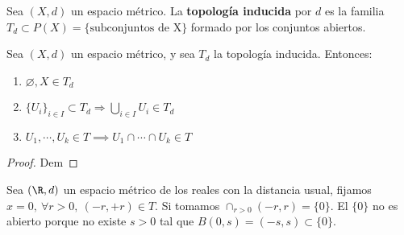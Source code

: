 \begin{ndef}
    Sea $(X,d)$ un espacio métrico. La \textbf{topología inducida} por $d$ es la familia $T_d \subset P(X) = \{\text{subconjuntos de X} \}$ formado por los conjuntos abiertos.
\end{ndef}
\begin{nprop}
  Sea $(X,d)$ un espacio métrico, y sea $T_d$ la topología inducida. Entonces:
  \begin{enumerate}
    \item $\varnothing ,X \in T_d$
    \item $\{U_i\}_{i \in I} \subset T_d \Rightarrow \bigcup_{i \in I} U_i \in T_d$
    \item $U_1, \cdots, U_k \in T \implies U_1 \cap \cdots \cap U_k \in T$
  \end{enumerate}
\end{nprop}
\begin{proof}
  Dem
\end{proof}

\begin{exmp}
  Sea $(\R,d)$ un espacio métrico de los reales con la distancia usual, fijamos $x=0,\ \forall r>0,\ (-r,+r) \in T$. Si tomamos $\cap_{r>0}(-r,r)=\{0\}$. El $\{0\}$ no es abierto porque no existe $s>0$ tal que $B(0,s)=(-s,s) \subset \{0\}$.
\end{exmp}

